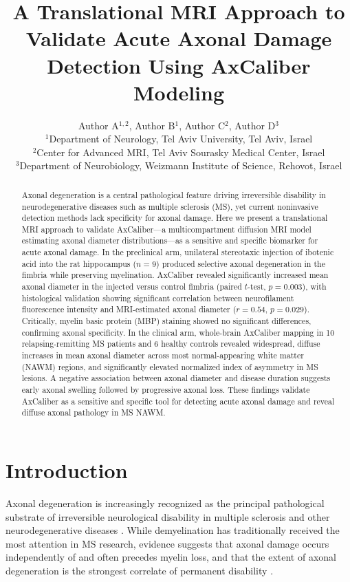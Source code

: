 \documentclass[11pt]{article}
\title{A Translational MRI Approach to Validate Acute Axonal Damage Detection Using AxCaliber Modeling}
\author{Author A$^{1,2}$, Author B$^{1}$, Author C$^{2}$, Author D$^{3}$ \\
\small $^{1}$Department of Neurology, Tel Aviv University, Tel Aviv, Israel \\
\small $^{2}$Center for Advanced MRI, Tel Aviv Sourasky Medical Center, Israel \\
\small $^{3}$Department of Neurobiology, Weizmann Institute of Science, Rehovot, Israel}
\date{}
\begin{document}
\maketitle

\begin{abstract}
Axonal degeneration is a central pathological feature driving irreversible disability in neurodegenerative diseases such as multiple sclerosis (MS), yet current noninvasive detection methods lack specificity for axonal damage. Here we present a translational MRI approach to validate AxCaliber---a multicompartment diffusion MRI model estimating axonal diameter distributions---as a sensitive and specific biomarker for acute axonal damage. In the preclinical arm, unilateral stereotaxic injection of ibotenic acid into the rat hippocampus ($n = 9$) produced selective axonal degeneration in the fimbria while preserving myelination. AxCaliber revealed significantly increased mean axonal diameter in the injected versus control fimbria (paired $t$-test, $p = 0.003$), with histological validation showing significant correlation between neurofilament fluorescence intensity and MRI-estimated axonal diameter ($r = 0.54$, $p = 0.029$). Critically, myelin basic protein (MBP) staining showed no significant differences, confirming axonal specificity. In the clinical arm, whole-brain AxCaliber mapping in 10 relapsing-remitting MS patients and 6 healthy controls revealed widespread, diffuse increases in mean axonal diameter across most normal-appearing white matter (NAWM) regions, and significantly elevated normalized index of asymmetry in MS lesions. A negative association between axonal diameter and disease duration suggests early axonal swelling followed by progressive axonal loss. These findings validate AxCaliber as a sensitive and specific tool for detecting acute axonal damage and reveal diffuse axonal pathology in MS NAWM.
\end{abstract}

\section{Introduction}

Axonal degeneration is increasingly recognized as the principal pathological substrate of irreversible neurological disability in multiple sclerosis and other neurodegenerative diseases \citep{trapp1998axonal, dutta2011mechanisms}. While demyelination has traditionally received the most attention in MS research, evidence suggests that axonal damage occurs independently of and often precedes myelin loss, and that the extent of axonal degeneration is the strongest correlate of permanent disability \citep{deStephano2001axonal, kutzelnigg2005cortical}.
\end{document}
